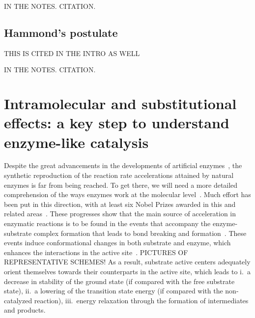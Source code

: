 IN THE NOTES.\@
CITATION.\@

\subsection{Hammond's postulate}

THIS IS CITED IN THE INTRO AS WELL

IN THE NOTES.\@
CITATION.\@

\section{Intramolecular and substitutional effects:
  a key step to understand enzyme-like catalysis}

Despite the great advancements in the developments of artificial enzymes~\cite{Breslow_1995},
the synthetic reproduction of the reaction rate accelerations attained by
natural enzymes is far from being reached.
To get there,
we will need a more detailed comprehension of the ways enzymes
work at the molecular level~\cite{Catalysis_in_Chemistry_and_Enzymology}.
Much effort has been put in this direction,
with at least six Nobel Prizes
awarded in this and related areas~\cite{Nobel_1929,Nobel_1946,Nobel_1957,Nobel_1975,Nobel_1997,Nobel_2013}.
These progresses show that the main source of acceleration in
enzymatic reactions is to be found in the events that accompany the
enzyme-substrate complex formation that leads to bond breaking and
formation~\cite{Catalysis_in_Chemistry_and_Enzymology}.
These events induce conformational changes in both substrate and enzyme,
which
enhances the interactions in the active site~\cite{Fischer_1890,Fischer_1894,Koshland_1958,Dafforn_1971,Kirby_1996}.
PICTURES OF REPRESENTATIVE SCHEMES!\@
As a result,
substrate active centers adequately orient themselves towards
their counterparts in the active site,
which leads to
i.\ a decrease in stability of the ground state (if compared with the
free substrate state),
ii.\ a lowering of the transition state energy (if compared with the
non-catalyzed reaction),
iii.\ energy relaxation through the formation of intermediates and
products.

